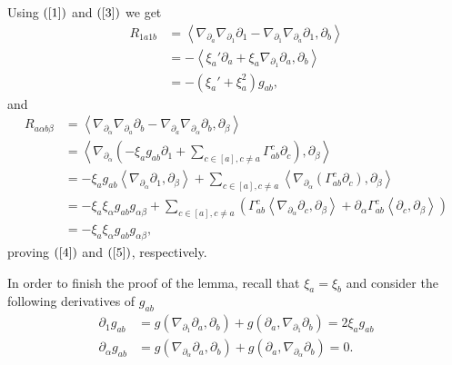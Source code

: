 \begin{demm}
	Using $(\ref{1})$ and $(\ref{3})$ we get
	\begin{align*}
		R_{1a1b}&=\left\langle\nabla_{\partial_{a}}\nabla_{\partial_{1}}\partial_{1}-\nabla_{\partial_{1}}\nabla_{\partial_{a}}\partial_{1},\partial_{b}\right\rangle\\
		&=-\left\langle\xi_{a}'\partial_{a}+\xi_{a}\nabla_{\partial_{1}}\partial_{a},\partial_{b}\right\rangle\\
		&=-(\xi_{a}'+\xi_{a}^2)g_{ab},
	\end{align*}
	and
	\begin{align*}
		R_{a\alpha b\beta}&=\left\langle\nabla_{\partial_{\alpha}}\nabla_{\partial_{a}}\partial_{b}-\nabla_{\partial_{a}}\nabla_{\partial_{\alpha}}\partial_{b},\partial_{\beta}\right\rangle\\
		&=\displaystyle\left\langle\nabla_{\partial_{\alpha}}\left(-\xi_{a}g_{ab}\partial_{1}+\sum_{c\in[a], c\neq a}\Gamma_{ab}^{c}\partial_{c}\right),\partial_{\beta}\right\rangle\\
		&=\displaystyle-\xi_{a}g_{ab}\left\langle\nabla_{\partial_{\alpha}}\partial_{1},\partial_{\beta}\right\rangle+\sum_{c\in[a], c\neq a}\left\langle\nabla_{\partial_{\alpha}}\left(\Gamma_{ab}^{c}\partial_{c}\right),\partial_{\beta}\right\rangle\\
		&=\displaystyle-\xi_{a}\xi_{\alpha}g_{ab}g_{\alpha\beta}+\sum_{c\in[a], c\neq a}(\Gamma_{ab}^{c}\left\langle\nabla_{\partial_{\alpha}}\partial_{c},\partial_{\beta}\right\rangle+\partial_{\alpha}\Gamma_{ab}^{c}\left\langle\partial_{c},\partial_{\beta}\right\rangle)\\
		&=\displaystyle-\xi_{a}\xi_{\alpha}g_{ab}g_{\alpha\beta},
	\end{align*}
	proving $(\ref{4})$ and $(\ref{5})$, respectively.
	
	In order to finish the proof of the lemma, recall that $\xi_{a}=\xi_{b}$ and consider the following derivatives of $g_{ab}$
	\begin{align*}
		\partial_{1}g_{ab}&=g(\nabla_{\partial_{1}}\partial_{a},\partial_{b})+g(\partial_{a},\nabla_{\partial_{1}}\partial_{b})=2\xi_{a}g_{ab}\\
		\partial_{\alpha}g_{ab}&=g(\nabla_{\partial_{\alpha}}\partial_{a},\partial_{b})+g(\partial_{a},\nabla_{\partial_{\alpha}}\partial_{b})=0.
	\end{align*}
\end{demm}


